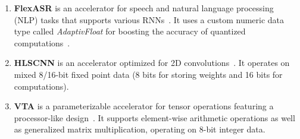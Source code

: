 \begin{enumerate}[leftmargin=*]

\item \textbf{FlexASR} is an accelerator for speech and natural language processing (NLP) tasks that supports various RNNs~\cite{tambe20219}.
%
It uses a custom numeric data type called \textit{AdaptivFloat} for boosting the accuracy of quantized computations~\cite{tambe2020algorithm}.
%
%
%


\item \textbf{HLSCNN} is an accelerator optimized for 2D convolutions~\cite{whatmough201916nm}.
%
%
It operates on mixed 8/16-bit fixed point data
(8 bits for storing weights and 16 bits for computations).
%

\item \textbf{VTA} is a parameterizable accelerator for tensor operations featuring a processor-like design~\cite{moreau2019hardware}.
%
It supports element-wise arithmetic operations as well as generalized matrix multiplication,
operating on 8-bit integer data.
%

\end{enumerate}
